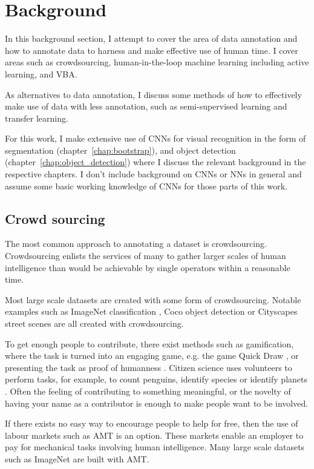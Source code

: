 \section {Background}

In this background section, I attempt to cover the area of data annotation and how to annotate data to harness and make effective use of human time. I cover areas such as crowdsourcing, human-in-the-loop machine learning including active learning, and \gls{VBA}.

As alternatives to data annotation, I discuss some methods of how to effectively make use of data with less annotation, such as semi-supervised learning and transfer learning. 

For this work, I make extensive use of \gls{CNN}s for visual recognition in the form of segmentation (chapter~\ref{chap:bootstrap}), and object detection (chapter~\ref{chap:object_detection}) where I discuss the relevant background in the respective chapters. I don't include background on \gls{CNN}s or \gls{NN}s in general and assume some basic working knowledge of \gls{CNN}s for those parts of this work.


\subsection {Crowd sourcing}

The most common approach to annotating a dataset is crowdsourcing. Crowdsourcing enlists the services of many to gather larger scales of human intelligence than would be achievable by single operators within a reasonable time.

Most large scale datasets are created with some form of crowdsourcing. Notable examples such as ImageNet classification \cite{JiaDeng2009}, Coco object detection \cite{Lin2014} or Cityscapes street scenes \cite{Cordts2016} are all created with crowdsourcing. 

To get enough people to contribute, there exist methods such as gamification, where the task is turned into an engaging game, e.g. the game Quick Draw \cite{Ha2017}, or presenting the task as proof of humanness \cite{Goodfellow2013a}. Citizen science uses volunteers to perform tasks, for example, to count penguins, identify species or identify planets \cite{Simpson2014, Masters2016}. Often the feeling of contributing to something meaningful, or the novelty of having your name as a contributor is enough to make people want to be involved.

If there exists no easy way to encourage people to help for free, then the use of labour markets such as \gls{AMT} is an option. These markets enable an employer to pay for mechanical tasks involving human intelligence. Many large scale datasets such as ImageNet \cite{Russakovsky2015} are built with \gls{AMT}. 


